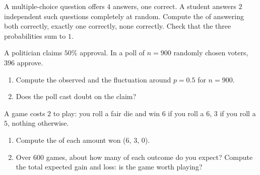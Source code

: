\begin{exercise}[$\star\star$]\label{exo:g10:proba:7}
A multiple-choice question offers $4$ answers, one correct. A student
answers $2$ independent such questions completely at random. Compute the
 of answering both correctly, exactly one correctly, none
correctly. Check that the three probabilities sum to $1$.
\end{exercise}

\begin{exercise}[$\star\star$]\label{exo:g10:proba:8}
A politician claims $50\%$ approval. In a poll of $n = 900$ randomly
chosen voters, $396$ approve.
\begin{enumerate}
  \item Compute the observed  and the fluctuation 
        around $p = 0.5$ for $n = 900$.
  \item Does the poll cast doubt on the claim?
\end{enumerate}
\end{exercise}

\begin{exercise}[$\star\star\star$]\label{exo:g10:proba:9}
A game costs $2$ to play: you roll a fair die and win $6$ if you roll a
$6$, $3$ if you roll a $5$, nothing otherwise.
\begin{enumerate}
  \item Compute the  of each amount won ($6$, $3$, $0$).
  \item Over $600$ games, about how many of each outcome do you expect?
        Compute the total expected gain and loss: is the game worth
        playing?
\end{enumerate}
\end{exercise}
